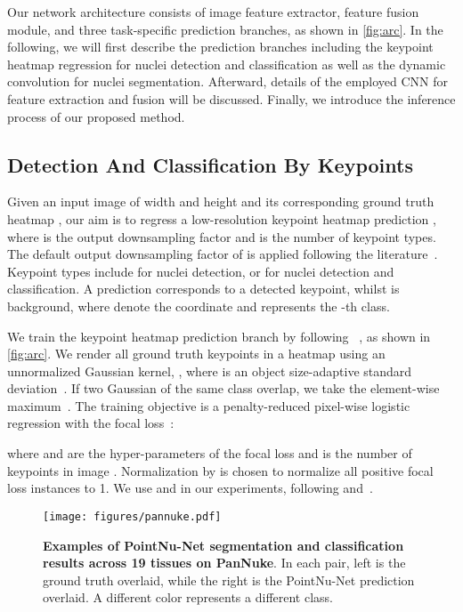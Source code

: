 \documentclass[lettersize,journal]{IEEEtran}
\begin{document}
Our network architecture consists of image feature extractor, feature fusion module, and three task-specific prediction branches, as shown in \autoref{fig:arc}. In the following, we will first describe the prediction branches including the keypoint heatmap regression for nuclei detection and classification as well as the dynamic convolution for nuclei segmentation. Afterward, details of the employed CNN for feature extraction and fusion will be discussed. Finally, we introduce the inference process of our proposed method.


\subsection{Detection And Classification By Keypoints}
Given an input image  of width  and height  and its corresponding ground truth heatmap , our aim is to regress a low-resolution keypoint heatmap prediction , where  is the output downsampling factor and  is the number of keypoint types. The default output downsampling factor of  is applied following the literature~\cite{stride1,stride2}. Keypoint types include  for nuclei detection, or  for nuclei detection and classification. A prediction  corresponds to a detected keypoint, whilst  is background, where  denote the coordinate and  represents the -th class.

We train the keypoint heatmap prediction branch by following ~\cite{CenterNet}, as shown in \autoref{fig:arc}. We render all ground truth keypoints in a heatmap  using an unnormalized Gaussian kernel, , where  is an object size-adaptive standard deviation~\cite{Cornernet}. 
If two Gaussian of the same class overlap, we take the element-wise maximum~\cite{stride1}. The training objective is a penalty-reduced pixel-wise logistic regression with the focal loss~\cite{focalloss}:



where  and  are the hyper-parameters of the focal loss and  is the number of keypoints in image . Normalization by  is chosen  to normalize all positive focal loss instances to 1. We use  and  in our experiments, following \cite{Cornernet} and~\cite{CenterNet}.

\begin{figure*}[t]
\centering
\texttt{[image: figures/pannuke.pdf]}
\caption{\textbf{Examples of PointNu-Net segmentation and classification results across 19 tissues on PanNuke}. In each pair, left is the ground truth overlaid, while the right is the PointNu-Net prediction overlaid. A different color represents a different class.}
\label{fig:pan}
\end{figure*}
\end{document}
